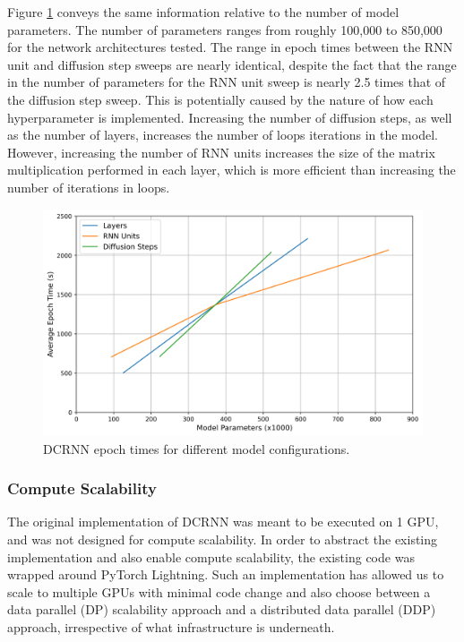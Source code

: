 \documentclass{article}
\begin{document}
Figure \ref{fig:model-scale} conveys the same information relative to the number of model parameters. The number of parameters ranges from roughly 100,000 to 850,000 for the network architectures tested. The range in epoch times between the RNN unit and diffusion step sweeps are nearly identical, despite the fact that the range in the number of parameters for the RNN unit sweep is nearly 2.5 times that of the diffusion step sweep. This is potentially caused by the nature of how each hyperparameter is implemented. Increasing the number of diffusion steps, as well as the number of layers, increases the number of loops iterations in the model. However, increasing the number of RNN units increases the size of the matrix multiplication performed in each layer, which is more efficient than increasing the number of iterations in loops.

\begin{figure}[hbt!]
	\centering
	\includegraphics[scale=0.65]{images/model_scale.png}
	\caption{DCRNN epoch times for different model configurations.}
	\label{fig:model-scale}
\end{figure}

\subsubsection{Compute Scalability}

The original implementation of DCRNN was meant to be executed on 1 GPU, and was not designed for compute scalability. In order to abstract the existing implementation and also enable compute scalability, the existing code was wrapped around PyTorch Lightning. Such an implementation has allowed us to scale to multiple GPUs with minimal code change and also choose between a data parallel (DP) scalability approach and a distributed data parallel (DDP) approach, irrespective of what infrastructure is underneath.
\end{document}
